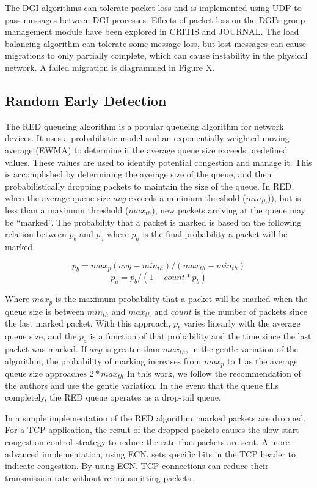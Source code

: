 The DGI algorithms can tolerate packet loss and is implemented using UDP to pass messages between DGI processes.
Effects of packet loss on the DGI's group management module have been explored in CRITIS and JOURNAL.
The load balancing algorithm can tolerate some message loss, but lost messages can cause migrations to only partially complete, which can cause instability in the physical network.
A failed migration is diagrammed in Figure X.

\subsection{Random Early Detection}
The RED queueing algorithm is a popular queueing algorithm for network devices.
It uses a probabilistic model and an exponentially weighted moving average (EWMA) to determine if the average queue size exceeds predefined values.
These values are used to identify potential congestion and manage it.
This is accomplished by determining the average size of the queue, and then probabilistically dropping packets to maintain the size of the queue.
In RED, when the average queue size $avg$ exceeds a minimum threshold ($min_{th})$), but is less than a maximum threshold ($max_{th}$), new packets arriving at the queue may be ``marked''.
The probability that a packet is marked is based on the following relation between $p_{b}$ and $p_{a}$ where $p_{a}$ is the final probability a packet will be marked.

\[ p_{b} = max_p (avg - min_{th}) / (max_{th}-min_{th}) \]
\[ p_{a} = p_{b} / (1-count * p_b) \]

Where $max_p$ is the maximum probability that a packet will be marked when the queue size is between $min_{th}$ and $max_{th}$ and $count$ is the number of packets since the last marked packet.
With this approach, $p_{b}$ varies linearly with the average queue size, and the $p_{a}$ is a function of that probability and the time since the last packet was marked.
If $avg$ is greater than $max_{th}$, in the gentle variation of the algorithm, the probability of marking increases from $max_p$ to 1 as the average queue size approaches $2*max_{th}$
In this work, we follow the recommendation of the authors and use the gentle variation.
In the event that the queue fills completely, the RED queue operates as a drop-tail queue.

In a simple implementation of the RED algorithm, marked packets are dropped.
For a TCP application, the result of the dropped packets causes the slow-start congestion control strategy to reduce the rate that packets are sent.
A more advanced implementation, using ECN, sets specific bits in the TCP header to indicate congestion.
By using ECN, TCP connections can reduce their transmission rate without re-transmitting packets.

